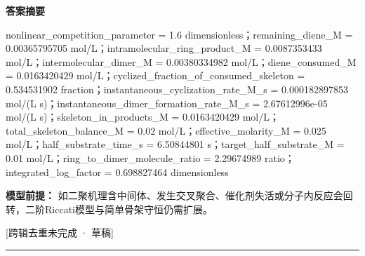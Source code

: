 \documentclass[UTF8,11pt,a4paper]{ctexart}
\begin{document}
\noindent\textbf{答案摘要}\par
nonlinear\_competition\_parameter = 1.6 dimensionless；remaining\_diene\_M = 0.00365795705 mol/L；intramolecular\_ring\_product\_M = 0.0087353433 mol/L；intermolecular\_dimer\_M = 0.00380334982 mol/L；diene\_consumed\_M = 0.0163420429 mol/L；cyclized\_fraction\_of\_consumed\_skeleton = 0.534531902 fraction；instantaneous\_cyclization\_rate\_M\_s = 0.000182897853 mol/(L s)；instantaneous\_dimer\_formation\_rate\_M\_s = 2.67612996e-05 mol/(L s)；skeleton\_in\_products\_M = 0.0163420429 mol/L；total\_skeleton\_balance\_M = 0.02 mol/L；effective\_molarity\_M = 0.025 mol/L；half\_substrate\_time\_s = 6.50844801 s；target\_half\_substrate\_M = 0.01 mol/L；ring\_to\_dimer\_molecule\_ratio = 2.29674989 ratio；integrated\_log\_factor = 0.698827464 dimensionless\par
\noindent\textbf{模型前提：}
如二聚机理含中间体、发生交叉聚合、催化剂失活或分子内反应会回转，二阶Riccati模型与简单骨架守恒仍需扩展。\par
\noindent\textcolor{red!65!black}{[跨辑去重未完成 · 草稿]} \par
\medskip\hrule\medskip
{}
\end{document}
